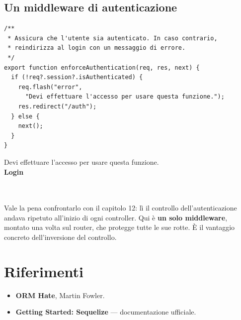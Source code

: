 \subsection{Un middleware di autenticazione}

\begin{affianco}[0.6][c]
\codicepiccolo
\begin{lstlisting}[style=js, name=middleware/auth.js]
/**
 * Assicura che l'utente sia autenticato. In caso contrario,
 * reindirizza al login con un messaggio di errore.
 */
export function enforceAuthentication(req, res, next) {
  if (!req?.session?.isAuthenticated) {
    req.flash("error",
      "Devi effettuare l'accesso per usare questa funzione.");
    res.redirect("/auth");
  } else {
    next();
  }
}
\end{lstlisting}
\risultato
\begin{browser}
  {\color{css-crimson}\small Devi effettuare l'accesso per usare questa funzione.}\\[4pt]
  {\Lora\bfseries\LARGE Login}\\[4pt]
  \wtcampo[3.0cm]{}\\[3pt]
  \wtcampo[3.0cm]{}\\[4pt]
\end{browser}
\end{affianco}

Vale la pena confrontarlo con il capitolo 12: lì il controllo
dell'autenticazione andava ripetuto all'inizio di ogni controller. Qui è
\textbf{un solo middleware}, montato una volta sul router, che protegge tutte le
sue rotte. È il vantaggio concreto dell'inversione del controllo.

\section{Riferimenti}

\begin{itemize}
  \item \textbf{ORM Hate}, Martin Fowler. \\
  \item \textbf{Getting Started: Sequelize} --- documentazione ufficiale. \\
\end{itemize}
